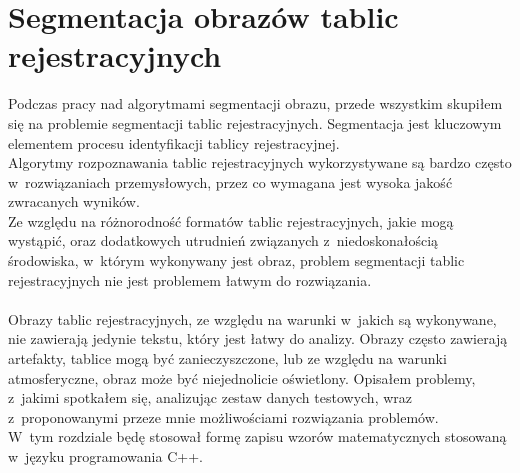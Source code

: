 \section{Segmentacja obrazów tablic rejestracyjnych}
Podczas pracy nad algorytmami segmentacji obrazu, przede wszystkim skupiłem się na problemie segmentacji tablic rejestracyjnych. Segmentacja jest kluczowym elementem procesu identyfikacji tablicy rejestracyjnej.\\
Algorytmy rozpoznawania tablic rejestracyjnych wykorzystywane są bardzo często w~rozwiązaniach przemysłowych, przez co wymagana jest wysoka jakość zwracanych wyników.\\
Ze względu na różnorodność formatów tablic rejestracyjnych, jakie mogą wystąpić, oraz dodatkowych utrudnień związanych z~niedoskonałością środowiska, w~którym wykonywany jest obraz, problem segmentacji tablic rejestracyjnych nie jest problemem łatwym do rozwiązania.
\paragraph{}
Obrazy tablic rejestracyjnych, ze względu na warunki w~jakich są wykonywane, nie zawierają jedynie tekstu, który jest łatwy do analizy. Obrazy często zawierają artefakty, tablice mogą być zanieczyszczone, lub ze względu na warunki atmosferyczne, obraz może być niejednolicie oświetlony. Opisałem problemy, z~jakimi spotkałem się, analizując zestaw danych testowych, wraz z~proponowanymi przeze mnie możliwościami rozwiązania problemów.\\
 W~tym rozdziale będę stosował formę zapisu wzorów matematycznych stosowaną w~języku programowania C++.
